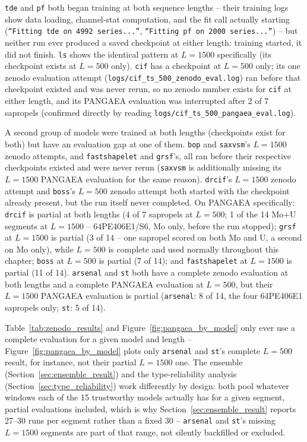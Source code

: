 \texttt{tde} and \texttt{pf} both began training at both sequence lengths -- their training logs show data loading, channel-stat computation, and the fit call actually starting (\texttt{``Fitting tde on 4992 series...''}, \texttt{``Fitting pf on 2000 series...''}) -- but neither run ever produced a saved checkpoint at either length: training started, it did not finish. \texttt{ls} shows the identical pattern at $L{=}1500$ specifically (its checkpoint exists at $L{=}500$ only). \texttt{cif} has a checkpoint at $L{=}500$ only; its one zenodo evaluation attempt (\texttt{logs/cif\_ts\_500\_zenodo\_eval.log}) ran before that checkpoint existed and was never rerun, so no zenodo number exists for \texttt{cif} at either length, and its PANGAEA evaluation was interrupted after 2 of 7 sapropels (confirmed directly by reading \texttt{logs/cif\_ts\_500\_pangaea\_eval.log}).

A second group of models were trained at both lengths (checkpoints exist for both) but have an evaluation gap at one of them. \texttt{bop} and \texttt{saxvsm}'s $L{=}1500$ zenodo attempts, and \texttt{fastshapelet} and \texttt{grsf}'s, all ran before their respective checkpoints existed and were never rerun (\texttt{saxvsm} is additionally missing its $L{=}1500$ PANGAEA evaluation for the same reason). \texttt{drcif}'s $L{=}1500$ zenodo attempt and \texttt{boss}'s $L{=}500$ zenodo attempt both started with the checkpoint already present, but the run itself never completed. On PANGAEA specifically: \texttt{drcif} is partial at both lengths (4 of 7 sapropels at $L{=}500$; 1 of the 14 Mo+U segments at $L{=}1500$ -- 64PE406E1/S6, Mo only, before the run stopped); \texttt{grsf} at $L{=}1500$ is partial (3 of 14 -- one sapropel scored on both Mo and U, a second on Mo only), while $L{=}500$ is complete and used normally throughout this chapter; \texttt{boss} at $L{=}500$ is partial (7 of 14); and \texttt{fastshapelet} at $L{=}1500$ is partial (11 of 14). \texttt{arsenal} and \texttt{st} both have a complete zenodo evaluation at both lengths and a complete PANGAEA evaluation at $L{=}500$, but their $L{=}1500$ PANGAEA evaluation is partial (\texttt{arsenal}: 8 of 14, the four 64PE406E1 sapropels only; \texttt{st}: 5 of 14).

Table~\ref{tab:zenodo_results} and Figure~\ref{fig:pangaea_by_model} only ever use a complete evaluation for a given model and length -- Figure~\ref{fig:pangaea_by_model} plots only \texttt{arsenal} and \texttt{st}'s complete $L{=}500$ result, for instance, not their partial $L{=}1500$ one. The ensemble (Section~\ref{sec:ensemble_result}) and the type-reliability analysis (Section~\ref{sec:type_reliability}) work differently by design: both pool whatever windows each of the 15 trustworthy models actually has for a given segment, partial evaluations included, which is why Section~\ref{sec:ensemble_result} reports 27--30 runs per segment rather than a fixed 30 -- \texttt{arsenal} and \texttt{st}'s missing $L{=}1500$ segments are part of that range, not silently backfilled or excluded.
